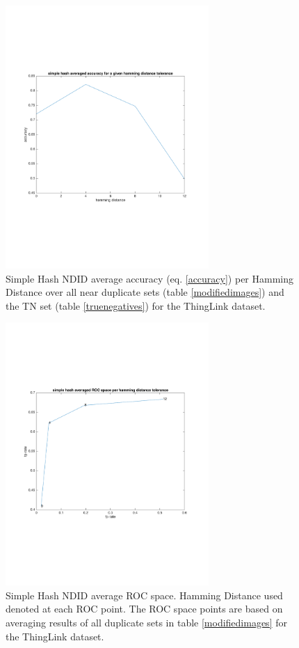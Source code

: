 \documentclass[english,12pt,a4paper,pdftex,elec,utf8]{aaltothesis}
\begin{document}
\begin{figure}[htb]
\begin{center}
\includegraphics[height=10cm]{figures/thinglink_simpleTotalAccuracy}
\end{center}
\caption{Simple Hash NDID average accuracy (eq. \ref{accuracy}) per Hamming Distance over all near duplicate sets (table \ref{modifiedimages}) and the TN set (table \ref{truenegatives}) for the ThingLink dataset.}
\label{thinglinksimpletotalaccuracy}
\end{figure}

\begin{figure}[htb]
\begin{center}
\includegraphics[height=10cm]{figures/thinglink_simpleTotalROC}
\end{center}
\caption{Simple Hash NDID average ROC space. Hamming Distance used denoted at each ROC point. The ROC space points are based on averaging results of all duplicate sets in table \ref{modifiedimages} for the ThingLink dataset. }
\label{thinglinksimpletotalroc}
\end{figure}
\end{document}
